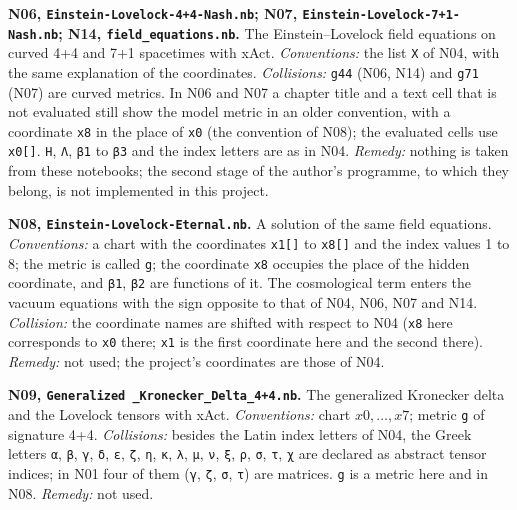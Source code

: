 \documentclass[
  10pt,
]{article}
\begin{document}
\textbf{N06, \texttt{Einstein-Lovelock-4+4-Nash.nb}; N07,
\texttt{Einstein-Lovelock-7+1-Nash.nb}; N14,
\texttt{field\_equations.nb}.} The Einstein--Lovelock field equations on
curved 4+4 and 7+1 spacetimes with xAct. \emph{Conventions:} the list
\texttt{X} of N04, with the same explanation of the coordinates.
\emph{Collisions:} \texttt{g44} (N06, N14) and \texttt{g71} (N07) are
curved metrics. In N06 and N07 a chapter title and a text cell that is
not evaluated still show the model metric in an older convention, with a
coordinate \texttt{x8} in the place of \texttt{x0} (the convention of
N08); the evaluated cells use \texttt{x0{[}{]}}. \texttt{H}, \texttt{Λ},
\texttt{β1} to \texttt{β3} and the index letters are as in N04.
\emph{Remedy:} nothing is taken from these notebooks; the second stage
of the author's programme, to which they belong, is not implemented in
this project.

\textbf{N08, \texttt{Einstein-Lovelock-Eternal.nb}.} A solution of the
same field equations. \emph{Conventions:} a chart with the coordinates
\texttt{x1{[}{]}} to \texttt{x8{[}{]}} and the index values 1 to 8; the
metric is called \texttt{g}; the coordinate \texttt{x8} occupies the
place of the hidden coordinate, and \texttt{β1}, \texttt{β2} are
functions of it. The cosmological term enters the vacuum equations with
the sign opposite to that of N04, N06, N07 and N14. \emph{Collision:}
the coordinate names are shifted with respect to N04 (\texttt{x8} here
corresponds to \texttt{x0} there; \texttt{x1} is the first coordinate
here and the second there). \emph{Remedy:} not used; the project's
coordinates are those of N04.

\textbf{N09, \texttt{Generalized\ \_Kronecker\_Delta\_4+4.nb}.} The
generalized Kronecker delta and the Lovelock tensors with xAct.
\emph{Conventions:} chart \(x0,\dots,x7\); metric \texttt{g} of
signature 4+4. \emph{Collisions:} besides the Latin index letters of
N04, the Greek letters \texttt{α}, \texttt{β}, \texttt{γ}, \texttt{δ},
\texttt{ε}, \texttt{ζ}, \texttt{η}, \texttt{κ}, \texttt{λ}, \texttt{μ},
\texttt{ν}, \texttt{ξ}, \texttt{ρ}, \texttt{σ}, \texttt{τ}, \texttt{χ}
are declared as abstract tensor indices; in N01 four of them
(\texttt{γ}, \texttt{ζ}, \texttt{σ}, \texttt{τ}) are matrices.
\texttt{g} is a metric here and in N08. \emph{Remedy:} not used.
\end{document}
